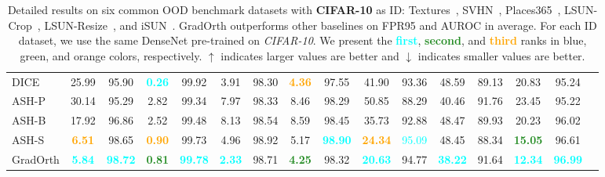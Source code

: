 \documentclass{article}
\begin{document}
\begin{table}
{\begin{tabular}{|l|c|c|c|c|c|c|c|c|c|c|c|c|c|c|c|}
DICE & 25.99&95.90&\textcolor{cyan}{\textbf{0.26}}&99.92&3.91&98.30&\textcolor{orange}{\textbf{4.36}}&97.55&41.90&93.36&48.59&89.13&20.83&95.24\\
ASH-P  & 30.14 & 95.29 & 2.82 & 99.34 & 7.97 & 98.33 & 8.46 & 98.29 & 50.85 & 88.29 & 40.46 & 91.76 & 23.45 & 95.22\\
ASH-B & 17.92 & 96.86 & 2.52 & 99.48 & 8.13 & 98.54 & 8.59 & 98.45 & 35.73 & 92.88 & 48.47 & 89.93 & 20.23 & 96.02 \\
ASH-S & \textcolor{orange}{\textbf{6.51}} & 98.65 & \textcolor{orange}{\textbf{0.90}} & 99.73 & 4.96 & 98.92 & 5.17 & \textcolor{cyan}{\textbf{98.90}} & \textcolor{orange}{\textbf{24.34}} & \textcolor{cyan}{95.09} & 48.45 & 88.34 & \textcolor{ForestGreen}{\textbf{15.05}} & 96.61 \\
GradOrth &\textcolor{cyan}{\textbf{5.84}}&\textcolor{cyan}{\textbf{98.72}}&\textcolor{ForestGreen}{\textbf{0.81}}&\textcolor{cyan}{\textbf{99.78}}&\textcolor{cyan}{\textbf{2.33}}&98.71&\textcolor{ForestGreen}{\textbf{4.25}}&98.32&\textcolor{cyan}{\textbf{20.63}}&94.77&\textcolor{cyan}{\textbf{38.22}}&91.64 &\textcolor{cyan}{\textbf{12.34} }& \textcolor{cyan}{\textbf{96.99}}\\
 \bottomrule
\end{tabular}
}
\caption{ Detailed results on six common OOD benchmark datasets with \textbf{CIFAR-10} as ID: Textures~\cite{cimpoi2014describing}, SVHN~\cite{netzer2011reading}, Places365~\cite{zhou2017places}, LSUN-Crop~\cite{yu2015lsun}, LSUN-Resize~\cite{yu2015lsun}, and iSUN~\cite{xu2015turkergaze}.  GradOrth outperforms other baselines on FPR95 and AUROC in average. For each ID dataset, we use the same DenseNet pre-trained on \textit{CIFAR-10}. We present the \textcolor{cyan}{\textbf{first}}, \textcolor{ForestGreen}{\textbf{second}}, and \textcolor{orange}{\textbf{third}} ranks in blue, green, and orange colors, respectively. $\uparrow$ indicates larger values are better and $\downarrow$ indicates smaller values are better.}
\label{tab:cifar10}
\vspace{-7mm}
\end{table}
\end{document}
